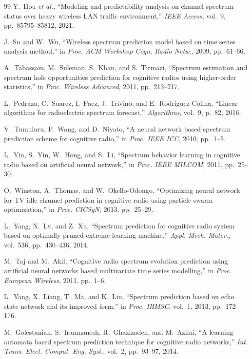 \documentclass[lettersize,journal]{IEEEtran}
\begin{document}
\begin{thebibliography}{99}
 Y.~Hou \emph{et al.}, ``Modeling and predictability analysis on channel spectrum status over heavy wireless LAN traffic environment,'' \emph{IEEE Access}, vol.~9, pp.~85795--85812, 2021.

 J.~Su and W.~Wu, ``Wireless spectrum prediction model based on time series analysis method,'' in \emph{Proc. ACM Workshop Cogn. Radio Netw.}, 2009, pp.~61--66.

 A.~Tabassam, M.~Suleman, S.~Khan, and S.~Tirmazi, ``Spectrum estimation and spectrum hole opportunities prediction for cognitive radios using higher-order statistics,'' in \emph{Proc. Wireless Advanced}, 2011, pp.~213--217.

 L.~Pedraza, C.~Suarez, I.~Paez, J.~Trivino, and E.~Rodr\'iguez-Colina, ``Linear algorithms for radioelectric spectrum forecast,'' \emph{Algorithms}, vol.~9, p.~82, 2016.

 V.~Tumuluru, P.~Wang, and D.~Niyato, ``A neural network based spectrum prediction scheme for cognitive radio,'' in \emph{Proc. IEEE ICC}, 2010, pp.~1--5.

 L.~Yin, S.~Yin, W.~Hong, and S.~Li, ``Spectrum behavior learning in cognitive radio based on artificial neural network,'' in \emph{Proc. IEEE MILCOM}, 2011, pp.~25--30.

 O.~Winston, A.~Thomas, and W.~Okello-Odongo, ``Optimizing neural network for TV idle channel prediction in cognitive radio using particle swarm optimization,'' in \emph{Proc. CICSyN}, 2013, pp.~25--29.

 L.~Yang, N.~Lv, and Z.~Xu, ``Spectrum prediction for cognitive radio system based on optimally pruned extreme learning machine,'' \emph{Appl. Mech. Mater.}, vol.~536, pp.~430--436, 2014.

 M.~Taj and M.~Akil, ``Cognitive radio spectrum evolution prediction using artificial neural networks based multivariate time series modelling,'' in \emph{Proc. European Wireless}, 2011, pp.~1--6.

 L.~Yang, X.~Liang, T.~Ma, and K.~Liu, ``Spectrum prediction based on echo state network and its improved form,'' in \emph{Proc. IHMSC}, vol.~1, 2013, pp.~172--176.

 M.~Golestanian, S.~Iranmanesh, R.~Ghazizadeh, and M.~Azimi, ``A learning automata based spectrum prediction technique for cognitive radio networks,'' \emph{Int. Trans. Elect. Comput. Eng. Syst.}, vol.~2, pp.~93--97, 2014.


\end{thebibliography}
\end{document}
